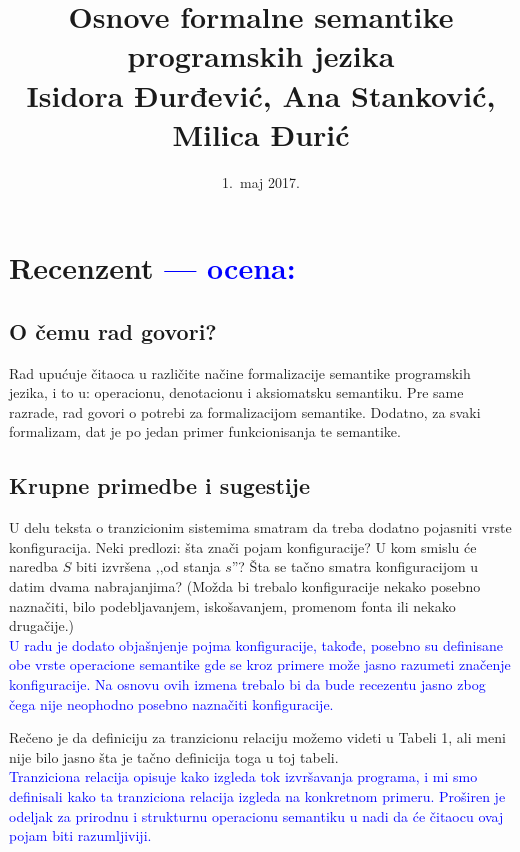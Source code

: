 \documentclass[a4paper]{report}
\newcommand{\odgovor}[1]{\textcolor{blue}{#1}}
\begin{document}
\title{Osnove formalne semantike programskih jezika\\ \small{Isidora Đurđević, Ana Stanković, Milica Đurić}}
\date{1.~maj 2017.}
\maketitle

\tableofcontents

\chapter{Recenzent \odgovor{--- ocena:}}

\section{O čemu rad govori?}

{Rad upućuje čitaoca u različite načine formalizacije semantike programskih jezika, i to u: operacionu, denotacionu i aksiomatsku semantiku. Pre same razrade, rad govori o potrebi za formalizacijom semantike. Dodatno, za svaki formalizam, dat je po jedan primer funkcionisanja te semantike.}

\section{Krupne primedbe i sugestije}

{U delu teksta o tranzicionim sistemima smatram da treba dodatno pojasniti vrste konfiguracija. Neki predlozi: šta znači pojam konfiguracije? U kom smislu će naredba $S$ biti izvršena ‚‚od stanja $s$''? Šta se tačno smatra konfiguracijom u datim dvama nabrajanjima? (Možda bi trebalo konfiguracije nekako posebno naznačiti, bilo podebljavanjem, iskošavanjem, promenom fonta ili nekako drugačije.)}\\
\odgovor{U radu je dodato objašnjenje pojma konfiguracije, takođe, posebno su definisane obe vrste operacione semantike gde se kroz primere može jasno razumeti značenje konfiguracije. Na osnovu ovih izmena trebalo bi da bude recezentu jasno zbog čega nije neophodno posebno naznačiti konfiguracije.}

{Rečeno je da definiciju za tranzicionu relaciju možemo videti u Tabeli 1, ali meni nije bilo jasno šta je tačno definicija toga u toj tabeli.}\\
\odgovor{Tranziciona relacija opisuje kako izgleda tok izvršavanja programa, i mi smo definisali kako ta tranziciona relacija izgleda na konkretnom primeru. Proširen je odeljak za prirodnu i strukturnu operacionu semantiku u nadi da će čitaocu ovaj pojam biti razumljiviji.}
\end{document}
